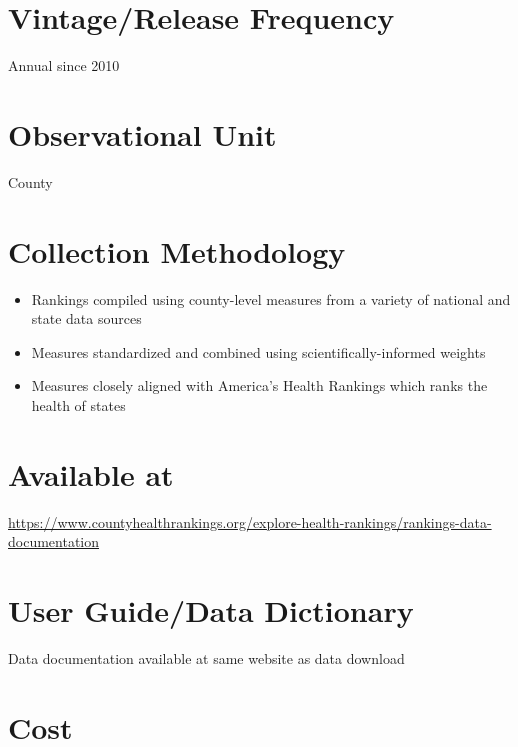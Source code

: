 \documentclass[
]{book}
\providecommand{\tightlist}{%
  \setlength{\itemsep}{0pt}\setlength{\parskip}{0pt}}
\begin{document}
\hypertarget{vintagerelease-frequency-19}{%
\section{Vintage/Release Frequency}\label{vintagerelease-frequency-19}}

Annual since 2010

\hypertarget{observational-unit-19}{%
\section{Observational Unit}\label{observational-unit-19}}

County

\hypertarget{collection-methodology-19}{%
\section{Collection Methodology}\label{collection-methodology-19}}

\begin{itemize}
\tightlist
\item
  Rankings compiled using county-level measures from a variety of national and state data sources
\item
  Measures standardized and combined using scientifically-informed weights
\item
  Measures closely aligned with America's Health Rankings which ranks the health of states
\end{itemize}

\hypertarget{available-at-19}{%
\section{Available at}\label{available-at-19}}

\url{https://www.countyhealthrankings.org/explore-health-rankings/rankings-data-documentation}

\hypertarget{user-guidedata-dictionary-19}{%
\section{User Guide/Data Dictionary}\label{user-guidedata-dictionary-19}}

Data documentation available at same website as data download

\hypertarget{cost-19}{%
\section{Cost}\label{cost-19}}
\end{document}

